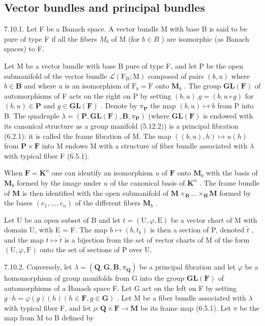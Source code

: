 \subsection{Vector bundles and principal bundles}

7.10.1. Let F be a Banach space. A vector bundle M with base B is said to be pure of type F if all the fibers \(M_{b}\) of M (for \(b \in B\) ) are isomorphic (as Banach spaces) to F.

Let M be a vector bundle with base B pure of type F, and let P be the open submanifold of the vector bundle \(\mathcal{L}(\mathrm{F}_{\mathrm{B}}; \mathrm{M})\) composed of pairs \((b, u)\) where \(b \in \mathbf{B}\) and where \(u\) is an isomorphism of \(\mathrm{F}_{b} = \mathrm{F}\) onto \(\mathbf{M}_{b}\) . The group \(\mathbf{GL}(\mathbf{F})\) of automorphisms of F acts on the right on P by setting \((b, u). g = (b, u \circ g)\) for \((b, u) \in \mathbf{P}\) and \(g \in \mathbf{GL}(\mathbf{F})\) . Denote by \(\pi_{\mathbf{P}}\) the map \((b, u) \mapsto b\) from P into B. The quadruple \(\lambda = (\mathbf{P}, \mathbf{GL}(\mathbf{F}), \mathbf{B}, \pi_{\mathbf{P}})\) (where \(\mathbf{GL}(\mathbf{F})\) is endowed with its canonical structure as a group manifold (5.12.2)) is a principal fibration (6.2.1): it is called the frame fibration of M. The map \(((b, u), h) \mapsto u(h)\) from \(\mathbf{P} \times \mathbf{F}\) into M endows M with a structure of fiber bundle associated with \(\lambda\) with typical fiber F (6.5.1).

When \(\mathbf{F} = \mathbf{K}^n\) one can identify an isomorphism \(u\) of \(\mathbf{F}\) onto \(\mathbf{M}_b\) with the basis of \(\mathbf{M}_b\) formed by the image under \(u\) of the canonical basis of \(\mathbf{K}^n\) . The frame bundle of \(\mathbf{M}\) is then identified with the open submanifold of \(\mathbf{M} \times_{\mathbf{B}} \ldots \times_{\mathbf{B}} \mathbf{M}\) formed by the bases \((e_1, \ldots, e_n)\) of the different fibers \(\mathbf{M}_b\) .

Let U be an open subset of B and let \(t = (\mathrm{U}, \varphi, \mathrm{E})\) be a vector chart of M with domain U, with E = F. The map \(b \mapsto (b, t_{b})\) is then a section of P, denoted \(\tilde{t}\) , and the map \(t \mapsto \tilde{t}\) is a bijection from the set of vector charts of M of the form \((\mathrm{U}, \varphi, \mathrm{F})\) onto the set of sections of P over U.

7.10.2. Conversely, let \(\lambda = (\mathbf{Q}, \mathbf{G}, \mathbf{B}, \pi_{\mathbf{Q}})\) be a principal fibration and let \(\varphi\) be a homomorphism of group manifolds from G into the group \(\mathbf{GL}(\mathbf{F})\) of automorphisms of a Banach space F. Let G act on the left on F by setting \(g \cdot h = \varphi(g)(h) (h \in \mathbf{F}, g \in \mathbf{G})\) . Let M be a fiber bundle associated with \(\lambda\) with typical fiber F, and let \(\rho: \mathbf{Q} \times \mathbf{F} \to \mathbf{M}\) be its frame map (6.5.1). Let \(\pi\) be the map from M to B defined by

